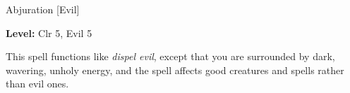 
Abjuration [Evil]

\textbf{Level:} Clr 5, Evil 5

This spell functions like \textit{dispel evil}, except that you are surrounded 
by dark, wavering, unholy energy, and the spell affects good creatures and spells 
rather than evil ones.

